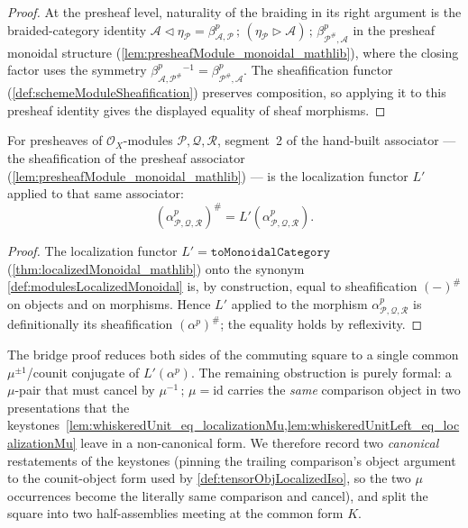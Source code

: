 \begin{proof}
  At the presheaf level, naturality of the braiding in its right argument is the
  braided-category identity
  \(\mathcal{A} \lhd \eta_{\mathcal{P}}
    = \beta^p_{\mathcal{A},\mathcal{P}} \,;\,
      (\eta_{\mathcal{P}} \rhd \mathcal{A}) \,;\,
      \beta^p_{\mathcal{P}^{\#},\mathcal{A}}\)
  in the presheaf monoidal structure
  (\cref{lem:presheafModule_monoidal_mathlib}), where the closing factor uses the
  symmetry \(\beta^p_{\mathcal{A},\mathcal{P}^{\#}}{}^{-1} =
  \beta^p_{\mathcal{P}^{\#},\mathcal{A}}\). The sheafification functor
  (\cref{def:schemeModuleSheafification}) preserves composition, so applying it to
  this presheaf identity gives the displayed equality of sheaf morphisms.
\end{proof}

\begin{lemma}
  \label{lem:sheafificationMapIso_assoc_eq_localized}
  For presheaves of \(\mathcal{O}_X\)-modules \(\mathcal{P}, \mathcal{Q},
  \mathcal{R}\), segment~2 of the hand-built associator --- the sheafification of
  the presheaf associator (\cref{lem:presheafModule_monoidal_mathlib}) --- is the
  localization functor \(L'\) applied to that same associator:
  \[
    (\alpha^p_{\mathcal{P},\mathcal{Q},\mathcal{R}})^{\#}
      = L'(\alpha^p_{\mathcal{P},\mathcal{Q},\mathcal{R}}).
  \]
\end{lemma}

\begin{proof}
  The localization functor \(L' = \texttt{toMonoidalCategory}\)
  (\cref{thm:localizedMonoidal_mathlib}) onto the synonym
  \cref{def:modulesLocalizedMonoidal} is, by construction, equal to sheafification
  \((-)^{\#}\) on objects and on morphisms. Hence \(L'\) applied to the morphism
  \(\alpha^p_{\mathcal{P},\mathcal{Q},\mathcal{R}}\) is definitionally its
  sheafification \((\alpha^p)^{\#}\); the equality holds by reflexivity.
\end{proof}

The bridge proof reduces both sides of the commuting square to a single common
\(\mu^{\pm1}\)/counit conjugate of \(L'(\alpha^p)\). The remaining obstruction is
purely formal: a \(\mu\)-pair that must cancel by \(\mu^{-1}\,;\,\mu = \mathrm{id}\)
carries the \emph{same} comparison object in two presentations that the
keystones~\cref{lem:whiskeredUnit_eq_localizationMu,lem:whiskeredUnitLeft_eq_localizationMu}
leave in a non-canonical form. We therefore record two \emph{canonical} restatements
of the keystones (pinning the trailing comparison's object argument to the
counit-object form used by \cref{def:tensorObjLocalizedIso}, so the two \(\mu\)
occurrences become the literally same comparison and cancel), and split the square
into two half-assemblies meeting at the common form \(K\).

